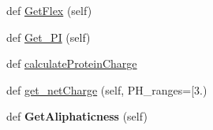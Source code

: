 \begin{DoxyCompactItemize}
\item 
def \hyperlink{classfeat__extract_1_1_prot_feat_1_1_prot_feat_a405aa53e6c8e9b6616739c9e176b8214}{Get\+Flex} (self)
\item 
def \hyperlink{classfeat__extract_1_1_prot_feat_1_1_prot_feat_a48e1171ffa3fa544caf662be9d09b292}{Get\+\_\+\+P\+I} (self)
\item 
def \hyperlink{classfeat__extract_1_1_prot_feat_1_1_prot_feat_ae15ef6f96924ec48e50aca6ea91dcbea}{calculate\+Protein\+Charge}
\item 
def \hyperlink{classfeat__extract_1_1_prot_feat_1_1_prot_feat_a9c66b67d86f78d7fd2e9c3f058d07924}{get\+\_\+net\+Charge} (self, P\+H\+\_\+ranges=\mbox{[}3.)
\item 
\hypertarget{classfeat__extract_1_1_prot_feat_1_1_prot_feat_a5536d99e2ad4ca79f6fd94fc5a74db5e}{}def {\bfseries Get\+Aliphaticness} (self)\label{classfeat__extract_1_1_prot_feat_1_1_prot_feat_a5536d99e2ad4ca79f6fd94fc5a74db5e}


\end{DoxyCompactItemize}
